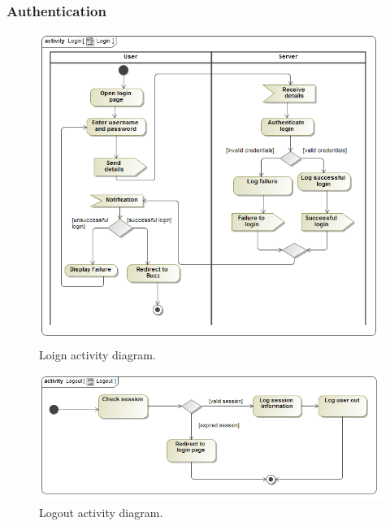 \documentclass [a4paper,12pt] {article}
\begin{document}
		\subsubsection{Authentication}
			\begin{figure}[H]
				\centering
				\includegraphics[width=1.0\textwidth]{LoginAD.png}
				\caption{Loign activity diagram.}
			\end{figure}
			\begin{figure}[H]
				\centering
				\includegraphics[width=1.0\textwidth]{LogoutAD.png}
				\caption{Logout activity diagram.}
			\end{figure}			
\end{document}
